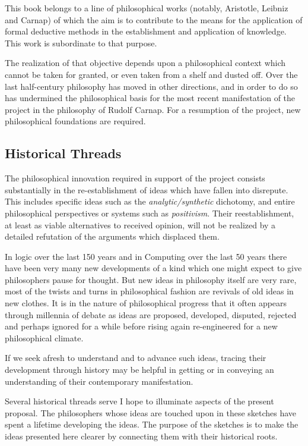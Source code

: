 This book belongs to a line of philosophical works (notably,
Aristotle, Leibniz and Carnap) of which the aim is
to contribute to the means for the application of formal deductive
methods in the establishment and application of knowledge.
This work is subordinate to that purpose.

The realization of that objective depends upon a philosophical
context which cannot be taken for granted, or even taken from a shelf
and dusted off.
Over the last half-century philosophy has moved in other directions,
and in order to do so has undermined the philosophical basis for the
most recent manifestation of the project in the philosophy of Rudolf
Carnap.
For a resumption of the project, new philosophical foundations are
required.

\subsection{Historical Threads}

The philosophical innovation required in support of the project
consists substantially in the re-establishment of ideas which have
fallen into disrepute.
This includes specific ideas such as the {\it analytic/synthetic}
dichotomy, and entire philosophical perspectives or systems such as
{\it positivism}.
Their reestablishment, at least as viable alternatives to received
opinion, will not be realized by a detailed refutation of the
arguments which displaced them.


In logic over the last 150 years and in Computing over the last 50
years there have been very many new developments of a kind which one
might expect to give philosophers pause for thought.
But new ideas in philosophy itself are very rare, most of the twists
and turns in philosophical fashion are revivals of old ideas in new
clothes.
It is in the nature of philosophical progress that it often appears
through millennia of debate as ideas are proposed, developed, disputed,
rejected and perhaps ignored for a while before rising again
re-engineered for a new philosophical climate.

If we seek afresh to understand and to advance such ideas, tracing
their development through history may be helpful in getting or in
conveying an understanding of their contemporary manifestation.

Several historical threads serve I hope to illuminate aspects of the
present proposal.
The philosophers whose ideas are touched upon in these sketches have
spent a lifetime developing the ideas.
The purpose of the sketches is to make the ideas presented here
clearer by connecting them with their historical roots.

